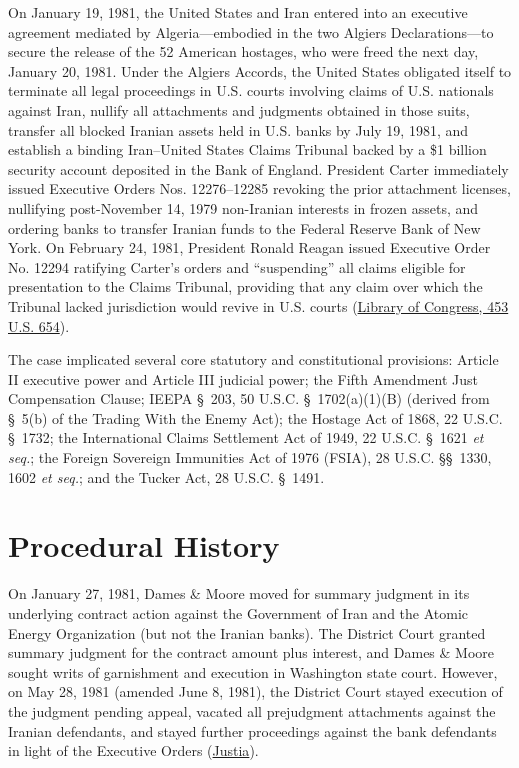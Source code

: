 \documentclass[12pt]{article}
\begin{document}
On January 19, 1981, the United States and Iran entered into an executive agreement mediated by Algeria---embodied in the two Algiers Declarations---to secure the release of the 52 American hostages, who were freed the next day, January 20, 1981. Under the Algiers Accords, the United States obligated itself to terminate all legal proceedings in U.S. courts involving claims of U.S. nationals against Iran, nullify all attachments and judgments obtained in those suits, transfer all blocked Iranian assets held in U.S. banks by July 19, 1981, and establish a binding Iran--United States Claims Tribunal backed by a \$1 billion security account deposited in the Bank of England. President Carter immediately issued Executive Orders Nos. 12276--12285 revoking the prior attachment licenses, nullifying post-November 14, 1979 non-Iranian interests in frozen assets, and ordering banks to transfer Iranian funds to the Federal Reserve Bank of New York. On February 24, 1981, President Ronald Reagan issued Executive Order No. 12294 ratifying Carter's orders and ``suspending'' all claims eligible for presentation to the Claims Tribunal, providing that any claim over which the Tribunal lacked jurisdiction would revive in U.S. courts (\href{https://tile.loc.gov/storage-services/service/ll/usrep/usrep453/usrep453654/usrep453654.pdf}{Library of Congress, 453 U.S. 654}).

The case implicated several core statutory and constitutional provisions: Article II executive power and Article III judicial power; the Fifth Amendment Just Compensation Clause; IEEPA \S\ 203, 50 U.S.C. \S\ 1702(a)(1)(B) (derived from \S\ 5(b) of the Trading With the Enemy Act); the Hostage Act of 1868, 22 U.S.C. \S\ 1732; the International Claims Settlement Act of 1949, 22 U.S.C. \S\ 1621 \textit{et seq.}; the Foreign Sovereign Immunities Act of 1976 (FSIA), 28 U.S.C. \S\S\ 1330, 1602 \textit{et seq.}; and the Tucker Act, 28 U.S.C. \S\ 1491.

\section{Procedural History}
On January 27, 1981, Dames \& Moore moved for summary judgment in its underlying contract action against the Government of Iran and the Atomic Energy Organization (but not the Iranian banks). The District Court granted summary judgment for the contract amount plus interest, and Dames \& Moore sought writs of garnishment and execution in Washington state court. However, on May 28, 1981 (amended June 8, 1981), the District Court stayed execution of the judgment pending appeal, vacated all prejudgment attachments against the Iranian defendants, and stayed further proceedings against the bank defendants in light of the Executive Orders (\href{https://supreme.justia.com/cases/federal/us/453/654/}{Justia}).
\end{document}
